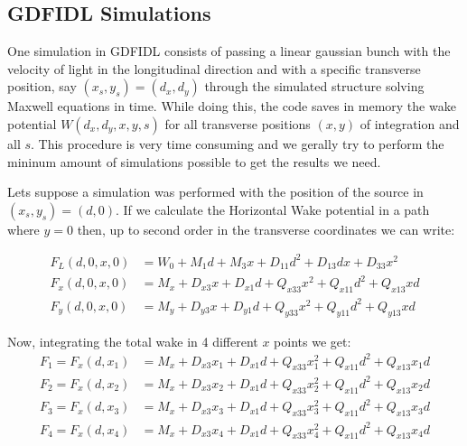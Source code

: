 \subsection{GDFIDL Simulations}

One simulation in GDFIDL consists of passing a linear gaussian bunch with the velocity of light in the longitudinal direction and with a specific transverse position, say $(x_s,y_s)=(d_x,d_y)$ through the simulated structure solving Maxwell equations in time. While doing this, the code saves in memory the wake potential $W(d_x,d_y,x,y,s)$ for all transverse positions $(x,y)$ of integration and all $s$. This procedure is very time consuming and we gerally try to perform the mininum amount of simulations possible to get the results we need.

Lets suppose a simulation was performed with the position of the source in $(x_s,y_s)=(d,0)$. If we calculate the Horizontal Wake potential in a path where $y=0$ then, up to second order in the transverse coordinates we can write:

\begin{align}
F_L(d,0,x,0) &= W_0  +  M_1d  +  M_3x + D_{11}d^2 + D_{13}dx + D_{33}x^2 \\
F_x(d,0,x,0) &= M_x + D_{x3} x + D_{x1} d + Q_{x33} x^2 + Q_{x11} d^2 + Q_{x13} x d\\
F_y(d,0,x,0) &= M_y + D_{y3} x + D_{y1} d + Q_{y33} x^2 + Q_{y11} d^2 + Q_{y13} x d
\end{align}

Now, integrating the total wake in 4 different $x$ points we get:
\begin{align}
	F_1 = F_x(d,x_1) &= M_x  +  D_{x3} x_1  +  D_{x1} d  +  Q_{x33} x_1^2  +  Q_{x11} d^2  +  Q_{x13} x_1 d \\
    F_2 = F_x(d,x_2) &= M_x  +  D_{x3} x_2  +  D_{x1} d  +  Q_{x33} x_2^2  +  Q_{x11} d^2  +  Q_{x13} x_2 d \\
    F_3 = F_x(d,x_3) &= M_x  +  D_{x3} x_3  +  D_{x1} d  +  Q_{x33} x_3^2  +  Q_{x11} d^2  +  Q_{x13} x_3 d \\
    F_4 = F_x(d,x_4) &= M_x  +  D_{x3} x_4  +  D_{x1} d  +  Q_{x33} x_4^2  +  Q_{x11} d^2  +  Q_{x13} x_4 d
\end{align}

